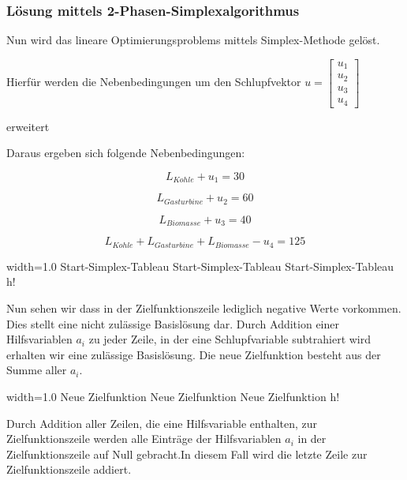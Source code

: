 \documentclass{eegreport}
\begin{document}
\subsubsection{Lösung mittels 2-Phasen-Simplexalgorithmus}


Nun wird das lineare Optimierungsproblems mittels Simplex-Methode gelöst.



Hierfür werden die Nebenbedingungen um den Schlupfvektor
$u=\begin{bmatrix}
u_1 \\ 
u_2 \\ 
u_3 \\ 
u_4

\end{bmatrix}$

erweitert

Daraus ergeben sich folgende Nebenbedingungen:


\begin{equation}
L_{Kohle} + u_1 =  30
\end{equation}

\begin{equation}
L_{Gasturbine}+ u_2 = 60
\end{equation}

\begin{equation}
L_{Biomasse} + u_3 = 40
\end{equation}

\begin{equation}
L_{Kohle} + L_{Gasturbine} + L_{Biomasse} - u_4 = 125
\end{equation}


       {width=1.0\textwidth}
       {Start-Simplex-Tableau}
       {Start-Simplex-Tableau}
       {Start-Simplex-Tableau}
       {h!}


Nun sehen wir dass in der Zielfunktionszeile lediglich negative Werte vorkommen. Dies stellt eine nicht zulässige Basislösung dar. Durch Addition einer Hilfsvariablen $a_i$ zu jeder Zeile, in der eine Schlupfvariable subtrahiert wird erhalten wir eine zulässige Basislösung. Die neue Zielfunktion besteht aus der Summe aller $a_i$. 
\newpage

       {width=1.0\textwidth}
       {Neue Zielfunktion}
       {Neue Zielfunktion}
       {Neue Zielfunktion}
       {h!}
       
       
       
Durch Addition aller Zeilen, die eine Hilfsvariable enthalten, zur Zielfunktionszeile
werden alle Einträge der Hilfsvariablen $a_i$
in der Zielfunktionszeile auf Null
gebracht.In diesem Fall wird die letzte Zeile zur Zielfunktionszeile addiert.
   
\end{document}
